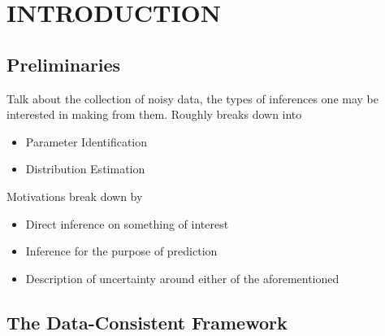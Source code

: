 \chapter{\uppercase{Introduction}} \label{chapter:01}

\section{Preliminaries}
Talk about the collection of noisy data, the types of inferences one may be interested in making from them.
Roughly breaks down into
\begin{itemize}
  \item Parameter Identification
  \item Distribution Estimation
\end{itemize}

Motivations break down by

\begin{itemize}
  \item Direct inference on something of interest
  \item Inference for the purpose of prediction
  \item Description of uncertainty around either of the aforementioned
\end{itemize}




\section{The Data-Consistent Framework}\label{sec:framework}





